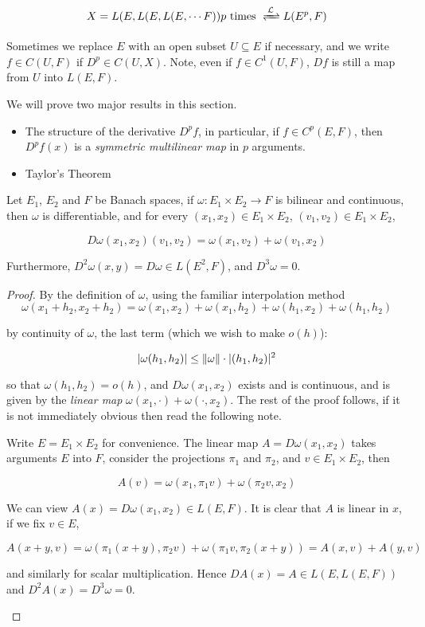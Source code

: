 \documentclass[../main-manifolds.tex]{subfiles}
\begin{document}
\[
    X = L(E, L(E, L(E,\cdots F))  p\text{ times }  \Isomor{L} L(E^p, F)
\]

Sometimes we replace $E$ with an open subset $U\subseteq E$ if necessary, and we write $f\in C(U,F)$ if $D^p\in C(U,X)$. Note, even if $f\in C^1(U,F)$, $Df$ is still a map from $U$ into $L(E,F)$. 

We will prove two major results in this section.

\begin{itemize}
    \item The structure of the derivative $D^p f$, in particular, if $f\in C^p(E,F)$, then $D^pf(x)$ is a \emph{symmetric multilinear map} in $p$ arguments. 
    \item Taylor's Theorem
\end{itemize}

\begin{wts}
    Let $E_1$, $E_2$ and $F$ be Banach spaces, if $\omega: E_1\times E_2\to F$ is bilinear and continuous, then $\omega$ is differentiable, and for every $(x_1, x_2)\in E_1\times E_2$, $(v_1,v_2)\in E_1\times E_2$,

    \[
        D\omega(x_1,x_2)(v_1,v_2) = \omega(x_1, v_2) + \omega(v_1, x_2)
    \]

    Furthermore, $D^2\omega(x,y) = D\omega\in L(E^2,F)$, and $D^3\omega = 0$.
    
\end{wts}
\begin{proof}
    By the definition of $\omega$, using the familiar interpolation method
    \[
        \omega(x_1 + h_2, x_2 + h_2) = \omega(x_1, x_2)  + \omega(x_1, h_2) + \omega(h_1, x_2) + \omega(h_1, h_2)
    \]

    by continuity of $\omega$, the last term (which we wish to make $o(h)$): 
    
    \[
    \vert \omega(h_1, h_2)\vert\leq \norm{\omega}\cdot\vert (h_1, h_2)\vert^2
    \]

    so that $\omega(h_1, h_2) = o(h)$, and $D\omega(x_1, x_2)$ exists and is continuous, and is given by the \emph{linear map} $\omega(x_1, \cdot) + \omega(\cdot, x_2)$. The rest of the proof follows, if it is not immediately obvious then read the following note.

    \begin{note}
        Write $E = E_1\times E_2$ for convenience. The linear map $A = D\omega(x_1, x_2)$ takes arguments $E$ into $F$, consider the projections $\pi_1$ and $\pi_2$, and $v\in E_1\times E_2$, then

        \[A(v) = \omega(x_1, \pi_1 v) + \omega(\pi_2 v, x_2)\]

        We can view $A(x) = D\omega(x_1, x_2)\in L(E,F)$. It is clear that $A$ is linear in $x$, if we fix $v\in E$, 

        \[
            A(x+y, v) = \omega(\pi_1(x+y), \pi_2 v) + \omega(\pi_1 v, \pi_2 (x+y)) = A(x,v) + A(y,v)
        \]

        and similarly for scalar multiplication. Hence $DA(x) = A\in L(E, L(E,F))$ and $D^2A(x) = D^3\omega = 0$.
    \end{note}
\end{proof}
\end{document}
